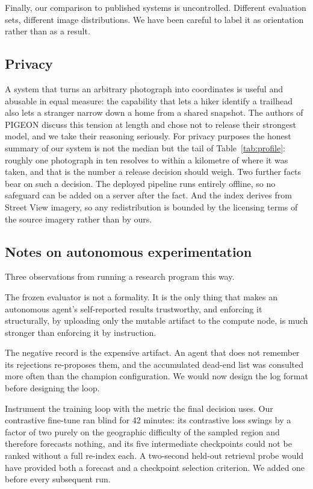 \documentclass[11pt,a4paper]{article}
\begin{document}
Finally, our comparison to published systems is uncontrolled. Different evaluation sets,
different image distributions. We have been careful to label it as orientation rather than
as a result.

\subsection{Privacy}

A system that turns an arbitrary photograph into coordinates is useful and abusable in
equal measure: the capability that lets a hiker identify a trailhead also lets a stranger
narrow down a home from a shared snapshot. The authors of PIGEON \cite{haas2024pigeon}
discuss this tension at length and chose not to release their strongest model, and we take
their reasoning seriously. For privacy purposes the honest summary of our system is not the
median but the tail of Table~\ref{tab:profile}: roughly one photograph in ten resolves to
within a kilometre of where it was taken, and that is the number a release decision should
weigh. Two further facts bear on such a decision. The deployed pipeline runs entirely
offline, so no safeguard can be added on a server after the fact. And the index derives
from Street View imagery, so any redistribution is bounded by the licensing terms of the
source imagery rather than by ours.

\subsection{Notes on autonomous experimentation}

Three observations from running a research program this way.

The frozen evaluator is not a formality. It is the only thing that makes an autonomous agent's
self-reported results trustworthy, and enforcing it structurally, by uploading only the
mutable artifact to the compute node, is much stronger than enforcing it by instruction.

The negative record is the expensive artifact. An agent that does not remember its rejections
re-proposes them, and the accumulated dead-end list was consulted more
often than the champion configuration. We would now design the log format before designing the
loop.

Instrument the training loop with the metric the final decision uses. Our contrastive fine-tune ran
blind for 42 minutes: its contrastive loss swings by a factor of two purely on the geographic
difficulty of the sampled region and therefore forecasts nothing, and its five intermediate
checkpoints could not be ranked without a full re-index each. A two-second held-out retrieval
probe would have provided both a forecast and a checkpoint selection criterion. We added one
before every subsequent run.
\end{document}
